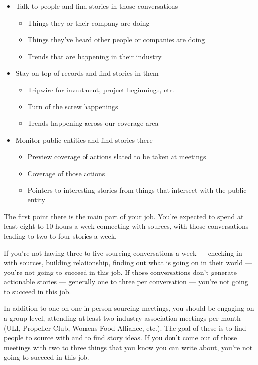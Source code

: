 \documentclass[
  11pt,
  american,
  letterpaperpaper,
  extrafontsizes,onecolumn,openright
  ]{memoir}
\providecommand{\tightlist}{%
  \setlength{\itemsep}{0pt}\setlength{\parskip}{0pt}}
\begin{document}
\begin{itemize}
\tightlist
\item
  Talk to people and find stories in those conversations

  \begin{itemize}
  \tightlist
  \item
    Things they or their company are doing
  \item
    Things they've heard other people or companies are doing
  \item
    Trends that are happening in their industry
  \end{itemize}
\item
  Stay on top of records and find stories in them

  \begin{itemize}
  \tightlist
  \item
    Tripwire for investment, project beginnings, etc.
  \item
    Turn of the screw happenings
  \item
    Trends happening across our coverage area
  \end{itemize}
\item
  Monitor public entities and find stories there

  \begin{itemize}
  \tightlist
  \item
    Preview coverage of actions slated to be taken at meetings
  \item
    Coverage of those actions
  \item
    Pointers to interesting stories from things that intersect with the public entity
  \end{itemize}
\end{itemize}

The first point there is the main part of your job. You're expected to spend at least eight to 10 hours a week connecting with sources, with those conversations leading to two to four stories a week.

If you're not having three to five sourcing conversations a week --- checking in with sources, building relationship, finding out what is going on in their world --- you're not going to succeed in this job. If those conversations don't generate actionable stories --- generally one to three per conversation --- you're not going to succeed in this job.

In addition to one-on-one in-person sourcing meetings, you should be engaging on a group level, attending at least two industry association meetings per month (ULI, Propeller Club, Womens Food Alliance, etc.). The goal of these is to find people to source with and to find story ideas. If you don't come out of those meetings with two to three things that you know you can write about, you're not going to succeed in this job.
\end{document}

